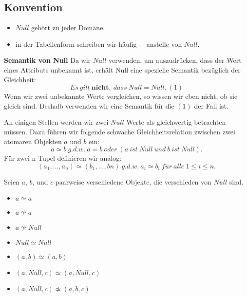 \documentclass[../DatenbankenFS23.tex]{subfiles}
\begin{document}
\subsection*{Konvention}
\begin{itemize}
    \item[] $Null$ gehört zu jeder Domäne.
    \item[] in der Tabellenform schreiben wir häufig − anstelle von $Null$.
\end{itemize}    

\begin{bemerkung}
    \textbf{Semantik von Null} \newline
    Da wir $Null$ verwenden, um auszudrücken, dass der Wert eines Attributs
    unbekannt ist, erhält Null eine spezielle Semantik bezüglich der Gleichheit:
    \[Es\ gilt\ \textbf{nicht},\ dass\ Null = Null.\ (1)\]
    Wenn wir zwei unbekannte Werte vergleichen, so wissen wir eben nicht, ob
    sie gleich sind. Deshalb verwenden wir eine Semantik für die $(1)$ der Fall ist.
    \newline
\end{bemerkung}

\begin{defn}
    An einigen Stellen werden wir zwei $Null$ Werte als gleichwertig betrachten
    müssen. Dazu führen wir folgende schwache Gleichheitsrelation zwischen
    zwei atomaren Objekten $a$ und $b$ ein:
    \[a \simeq b\ g.d.w.\ a = b\ oder\ (a\ ist\ Null\ und\ b\ ist\ Null).\]
    Für zwei n-Tupel definieren wir analog:
    \[ (a_1, \dots , a_n) \simeq (b_1, \dots , bn)\ g.d.w.\ a_i \simeq b_i\ f\ddot{u}r\ alle\ 1 \leq i \leq n.\]
\end{defn}
\begin{beispiel}
    Seien $a$, $b$, und $c$ paarweise verschiedene Objekte, die verschieden von $Null$ sind.

    \begin{itemize}
        \item $a \simeq a$
        \item $a \not\simeq a$
        \item $a \not\simeq Null$
        \item $Null \simeq Null$
        \item $(a, b) \simeq (a, b)$
        \item $(a, Null, c) \simeq (a, Null, c)$
        \item $(a, Null, c) \not\simeq (a, b, c)$
    \end{itemize}
\end{beispiel}
\end{document}
